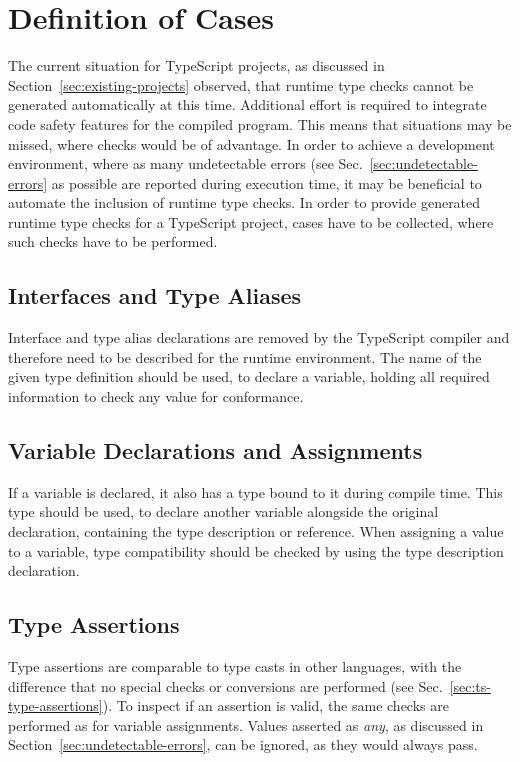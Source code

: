 \section{Definition of Cases}
\label{sec:type-check-situations}

The current situation for TypeScript projects, as discussed in Section~\ref{sec:existing-projects} observed, that runtime type checks cannot be generated automatically at this time. Additional effort is required to integrate code safety features for the compiled program. This means that situations may be missed, where checks would be of advantage. In order to achieve a development environment, where as many undetectable errors (see Sec.~\ref{sec:undetectable-errors} as possible are reported during execution time, it may be beneficial to automate the inclusion of runtime type checks. In order to provide generated runtime type checks for a TypeScript project, cases have to be collected, where such checks have to be performed.

\subsection{Interfaces and Type Aliases}

Interface and type alias declarations are removed by the TypeScript compiler and therefore need to be described for the runtime environment. The name of the given type definition should be used, to declare a variable, holding all required information to check any value for conformance.

\subsection{Variable Declarations and Assignments}

If a variable is declared, it also has a type bound to it during compile time. This type should be used, to declare another variable alongside the original declaration, containing the type description or reference. When assigning a value to a variable, type compatibility should be checked by using the type description declaration.

\subsection{Type Assertions}

Type assertions are comparable to type casts in other languages, with the difference that no special checks or conversions are performed (see Sec.~\ref{sec:ts-type-assertions}). To inspect if an assertion is valid, the same checks are performed as for variable assignments. Values asserted as \emph{any}, as discussed in Section~\ref{sec:undetectable-errors}, can be ignored, as they would always pass.

